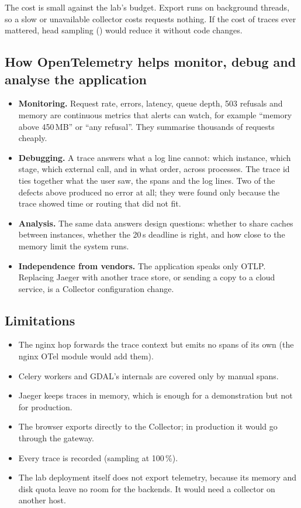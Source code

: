 \documentclass[11pt,a4paper]{article}
\begin{document}
The cost is small against the lab's budget. Export runs on background threads, so a slow or
unavailable collector costs requests nothing. If the cost of traces ever mattered, head sampling
() would reduce it without code changes.

\subsection{How OpenTelemetry helps monitor, debug and analyse the application}
\begin{itemize}
  \item \textbf{Monitoring.} Request rate, errors, latency, queue depth, 503 refusals and memory
    are continuous metrics that alerts can watch, for example ``memory above 450\,MB'' or ``any
     refusal''. They summarise thousands of requests cheaply.
  \item \textbf{Debugging.} A trace answers what a log line cannot: which instance, which stage,
    which external call, and in what order, across processes. The trace id ties together what
    the user saw, the spans and the log lines. Two of the defects above produced no error at
    all; they were found only because the trace showed time or routing that did not fit.
  \item \textbf{Analysis.} The same data answers design questions: whether to share caches
    between instances, whether the 20\,s deadline is right, and how close to the memory limit
    the system runs.
  \item \textbf{Independence from vendors.} The application speaks only OTLP. Replacing Jaeger
    with another trace store, or sending a copy to a cloud service, is a Collector configuration
    change.
\end{itemize}

\subsection{Limitations}
\begin{itemize}
  \item The nginx hop forwards the trace context but emits no spans of its own (the nginx OTel
    module would add them).
  \item Celery workers and GDAL's internals are covered only by manual spans.
  \item Jaeger keeps traces in memory, which is enough for a demonstration but not for production.
  \item The browser exports directly to the Collector; in production it would go through the
    gateway.
  \item Every trace is recorded (sampling at 100\,\%).
  \item The lab deployment itself does not export telemetry, because its memory and disk quota
    leave no room for the backends. It would need a collector on another host.
\end{itemize}
\end{document}
